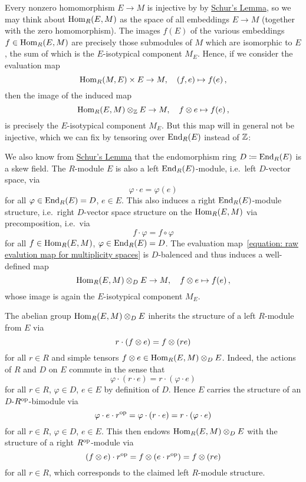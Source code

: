 \begin{fluff}
  \label{fluff: introducting multiplicity spaces}
  Every nonzero homomorphism $E \to M$ is injective by by \hyperref[proposition: schurs lemma for modules]{Schur’s Lemma}, so we may think about $\operatorname{Hom}_R(E,M)$ as the space of all embeddings $E \to M$ (together with the zero homomorphism).
  The images $f(E)$ of the various embeddings $f \in \operatorname{Hom}_R(E,M)$ are precisely those submodules of $M$ which are isomorphic to $E$, the sum of which is the $E$-isotypical component $M_E$.
  Hence, if we consider the evaluation map
  \begin{equation}
    \label{equation: raw evalution map for multiplicity spaces}
            \operatorname{Hom}_R(M,E) \times E
    \to     M,
    \quad   (f, e)
    \mapsto f(e) \,,
  \end{equation}
  then the image of the induced map
  \[            
            \operatorname{Hom}_R(E,M) \mathbin{\otimes}_{\mathbb{Z}} E
    \to     M,
    \quad   f \mathbin{\otimes} e
    \mapsto f(e) \,,
  \]
  is precisely the $E$-isotypical component $M_E$.
  But this map will in general not be injective, which we can fix by tensoring over $\operatorname{End}_R(E)$ instead of $\mathbb{Z}$:
  
  We also know from \hyperref[proposition: schurs lemma for modules]{Schur’s Lemma} that the endomorphism ring $D \coloneqq \operatorname{End}_R(E)$ is a skew field.
  The $R$-module $E$ is also a left $\operatorname{End}_R(E)$-module, i.e.\ left $D$-vector space, via
  \[
      \varphi \cdot e
    = \varphi(e)
  \]
  for all $\varphi \in \operatorname{End}_R(E) = D$, $e \in E$.
  This also induces a right $\operatorname{End}_R(E)$-module structure, i.e.\ right $D$-vector space structure on the $\operatorname{Hom}_R(E,M)$ via precomposition, i.e.\ via
  \[
      f \cdot \varphi
    = f \circ \varphi
  \]
  for all $f \in \operatorname{Hom}_R(E,M)$, $\varphi \in \operatorname{End}_R(E) = D$.
  The evaluation map~\eqref{equation: raw evalution map for multiplicity spaces} is $D$-balenced and thus induces a well-defined map
  \[            
            \operatorname{Hom}_R(E,M) \mathbin{\otimes}_D E
    \to     M,
    \quad   f \mathbin{\otimes} e
    \mapsto f(e) \,,
  \]
  whose image is again the $E$-isotypical component $M_E$.
  
  The abelian group $\operatorname{Hom}_R(E,M) \mathbin{\otimes}_D E$ inherits the structure of a left $R$-module from $E$ via
  \[
      r \cdot (f \mathbin{\otimes} e)
    = f \mathbin{\otimes} (r e)
  \]
  for all $r \in R$ and simple tensors $f \mathbin{\otimes} e \in \operatorname{Hom}_R(E,M) \mathbin{\otimes}_D E$.
  Indeed, the actions of $R$ and $D$ on $E$ commute in the sense that
  \[
      \varphi \cdot (r \cdot e)
    = r \cdot (\varphi \cdot e)
  \]
  for all $r \in R$, $\varphi \in D$, $e \in E$ by definition of $D$.
  Hence $E$ carries the structure of an $D$-$R^{\operatorname{op}}$-bimodule via
  \[
      \varphi \cdot e \cdot r^{\operatorname{op}}
    = \varphi \cdot (r \cdot e)
    = r \cdot (\varphi \cdot e)
  \]
  for all $r \in R$, $\varphi \in D$, $e \in E$.
  This then endows $\operatorname{Hom}_R(E,M) \mathbin{\otimes}_D E$ with the structure of a right $R^{\operatorname{op}}$-module via
  \[
      (f \mathbin{\otimes} e) \cdot r^{\operatorname{op}}
    = f \mathbin{\otimes} (e \cdot r^{\operatorname{op}})
    = f \mathbin{\otimes} (r e)
  \]
  for all $r \in R$, which corresponds to the claimed left $R$-module structure.
\end{fluff}


